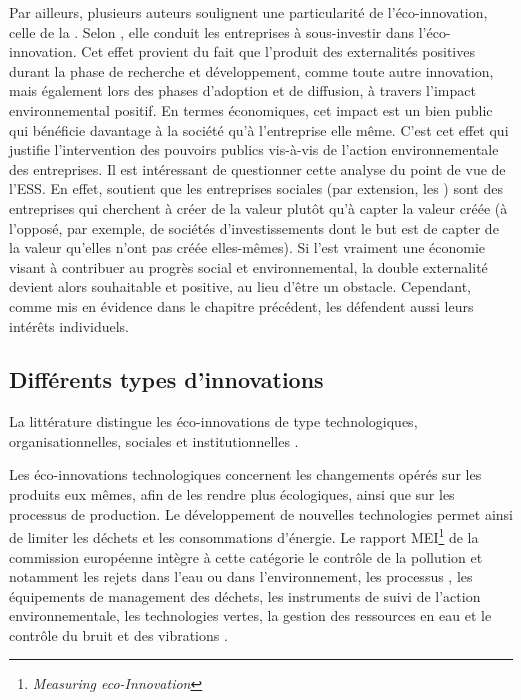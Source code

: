             Par ailleurs, plusieurs auteurs soulignent une particularité de l'éco-innovation, celle de la  \parencite{faucheux2011it, rennings2000redefining, ozusaglam2012environmental}. Selon \textcite{ozusaglam2012environmental}, elle conduit les entreprises à sous-investir dans l'éco-innovation. Cet effet provient du fait que l'\ei produit des externalités positives durant la phase de recherche et développement, comme toute autre innovation, mais également lors des phases d'adoption et de diffusion, à travers l'impact environnemental positif. En termes économiques, cet impact est un bien public qui bénéficie davantage à la société qu'à l'entreprise elle même. C'est cet effet qui justifie l'intervention des pouvoirs publics vis-à-vis de l'action environnementale des entreprises. Il est intéressant de questionner cette analyse du point de vue de l'ESS. En effet, \textcite{santos2012positive} soutient que les entreprises sociales (par extension, les \oess) sont des entreprises qui cherchent à créer de la valeur plutôt qu'à capter la valeur créée (à l'opposé, par exemple, de sociétés d'investissements dont le but est de capter de la valeur qu'elles n'ont pas créée elles-mêmes). Si l'\ess est vraiment une économie visant à contribuer au progrès social et environnemental, la double externalité devient alors souhaitable et positive, au lieu d'être un obstacle. Cependant, comme mis en évidence dans le chapitre précédent, les \oess défendent aussi leurs intérêts individuels.

    \subsection{Différents types d'innovations}
        La littérature distingue les éco-innovations de type technologiques, organisationnelles, sociales et institutionnelles \parencite{rennings2000redefining}.

        Les éco-innovations technologiques concernent les changements opérés sur les produits eux mêmes, afin de les rendre plus écologiques, ainsi que sur les processus de production. Le développement de nouvelles technologies permet ainsi de limiter les déchets et les consommations d'énergie. Le rapport MEI\footnote{\textit{Measuring eco-Innovation}} de la commission européenne intègre à cette catégorie le contrôle de la pollution et notamment les rejets dans l'eau ou dans l'environnement, les processus , les équipements de management des déchets, les instruments de suivi de l'action environnementale, les technologies vertes, la gestion des ressources en eau et le contrôle du bruit et des vibrations \parencite[][p.10]{kemp2007final}.

